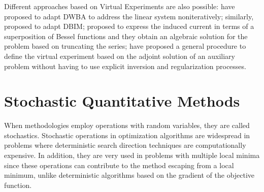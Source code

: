 			Different approaches based on Virtual Experiments are also possible: \cite{donato2016new} have proposed to adapt DWBA to address the linear system noniteratively; similarly, \cite{palmeri2017microwave} proposed to adapt DBIM; \cite{bevacqua2015algebraic} proposed to express the induced current in terms of a superposition of Bessel functions and they obtain an algebraic solution for the problem based on truncating the series; \cite{bevacqua2021simple} have proposed a general procedure to define the virtual experiment based on the adjoint solution of an auxiliary problem without having to use explicit inversion and regularization processes.

	\section{Stochastic Quantitative Methods}\label{chap:methods:stochastic}
	
		When methodologies employ operations with random variables, they are called stochastics. Stochastic operations in optimization algorithms are widespread in problems where deterministic search direction techniques are computationally expensive. In addition, they are very used in problems with multiple local minima since these operations can contribute to the method escaping from a local minimum, unlike deterministic algorithms based on the gradient of the objective function.
		
